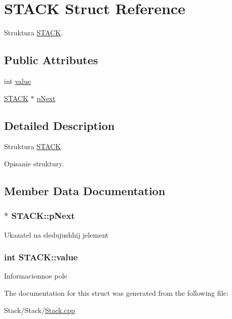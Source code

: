\hypertarget{struct_s_t_a_c_k}{}\section{S\+T\+A\+C\+K Struct Reference}
\label{struct_s_t_a_c_k}


Struktura \hyperlink{struct_s_t_a_c_k}{S\+T\+A\+C\+K}.  


\subsection*{Public Attributes}
\begin{DoxyCompactItemize}
\item 
int \hyperlink{struct_s_t_a_c_k_a203234cbd2f83dde9225183959d55137}{value}
\item 
\hyperlink{struct_s_t_a_c_k}{S\+T\+A\+C\+K} $\ast$ \hyperlink{struct_s_t_a_c_k_ac395950d986271852faba62ce5108a34}{p\+Next}
\end{DoxyCompactItemize}


\subsection{Detailed Description}
Struktura \hyperlink{struct_s_t_a_c_k}{S\+T\+A\+C\+K}. 

Opisanie struktury. 

\subsection{Member Data Documentation}
\hypertarget{struct_s_t_a_c_k_ac395950d986271852faba62ce5108a34}{}
\subsubsection[{p\+Next}]{$\ast$ S\+T\+A\+C\+K\+::p\+Next}\label{struct_s_t_a_c_k_ac395950d986271852faba62ce5108a34}
Ukazatel\textquotesingle{} na sledujushhij jelement \hypertarget{struct_s_t_a_c_k_a203234cbd2f83dde9225183959d55137}{}
\subsubsection[{value}]{\setlength{\rightskip}{0pt plus 5cm}int S\+T\+A\+C\+K\+::value}\label{struct_s_t_a_c_k_a203234cbd2f83dde9225183959d55137}
Informacionnoe pole 

The documentation for this struct was generated from the following file\+:\begin{DoxyCompactItemize}
\item 
Stack/\+Stack/\hyperlink{_stack_8cpp}{Stack.\+cpp}\end{DoxyCompactItemize}
